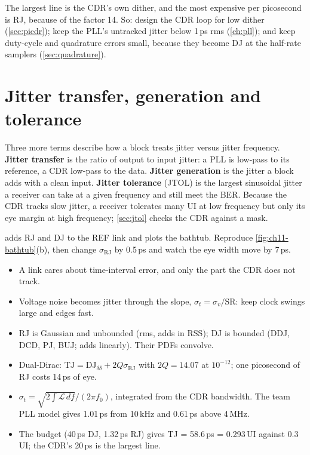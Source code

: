 \begin{insight}
The largest line is the CDR's own dither, and the most expensive per picosecond is RJ, because of the factor 14. So: design the CDR loop for low dither (\cref{sec:picdr}); keep the PLL's untracked jitter below 1\,ps rms (\cref{ch:pll}); and keep duty-cycle and quadrature errors small, because they become DJ at the half-rate samplers (\cref{sec:quadrature}).
\end{insight}

\section{Jitter transfer, generation and tolerance}\label{sec:ch11-jtran}

Three more terms describe how a block treats jitter versus jitter frequency. \textbf{Jitter transfer} is the ratio of output to input jitter: a PLL is low-pass to its reference, a CDR low-pass to the data. \textbf{Jitter generation} is the jitter a block adds with a clean input. \textbf{Jitter tolerance} (JTOL) is the largest sinusoidal jitter a receiver can take at a given frequency and still meet the BER. Because the CDR tracks slow jitter, a receiver tolerates many UI at low frequency but only its eye margin at high frequency; \cref{sec:jtol} checks the \OS{} CDR against a mask.

\begin{tryit}
 adds RJ and DJ to the REF link and plots the bathtub. Reproduce \cref{fig:ch11-bathtub}(b), then change $\sigma_\mathrm{RJ}$ by 0.5\,ps and watch the eye width move by 7\,ps.
\end{tryit}

\begin{takeaways}
\begin{itemize}
  \item A link cares about time-interval error, and only the part the CDR does not track.
  \item Voltage noise becomes jitter through the slope, $\sigma_t = \sigma_v/\mathrm{SR}$: keep clock swings large and edges fast.
  \item RJ is Gaussian and unbounded (rms, adds in RSS); DJ is bounded (DDJ, DCD, PJ, BUJ; adds linearly). Their PDFs convolve.
  \item Dual-Dirac: $\mathrm{TJ} = \mathrm{DJ}_{\delta\delta} + 2Q\sigma_\mathrm{RJ}$ with $2Q = 14.07$ at $10^{-12}$; one picosecond of RJ costs 14\,ps of eye.
  \item $\sigma_t = \sqrt{2\int\mathcal{L}\,df}/(2\pi f_0)$, integrated from the CDR bandwidth. The team PLL model gives 1.01\,ps from 10\,kHz and 0.61\,ps above 4\,MHz.
  \item The \OS{} budget (40\,ps DJ, 1.32\,ps RJ) gives TJ = 58.6\,ps = 0.293\,UI against 0.3\,UI; the CDR's 20\,ps is the largest line.
\end{itemize}
\end{takeaways}
